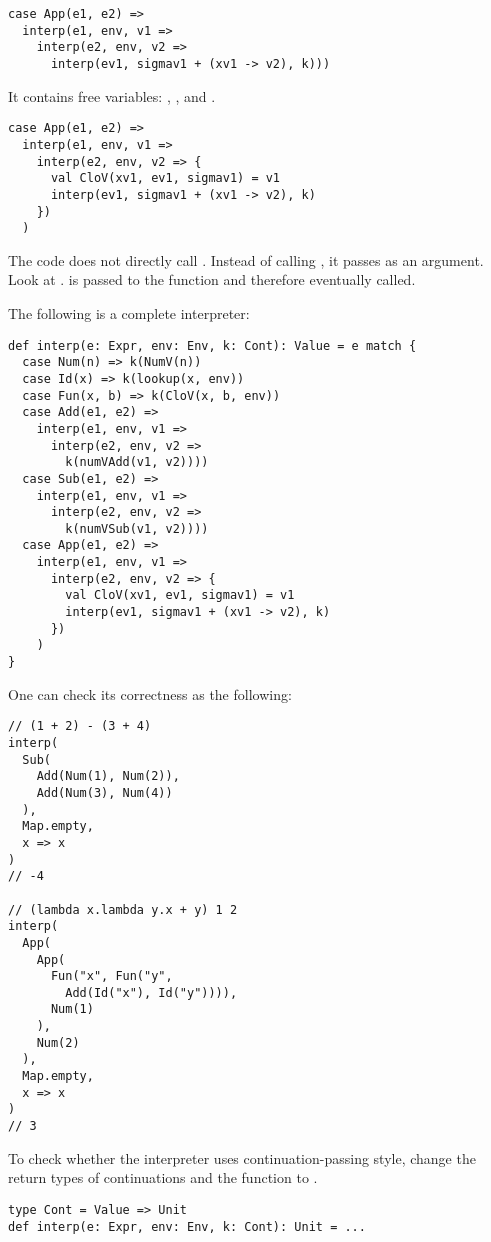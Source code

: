 \begin{verbatim}
case App(e1, e2) =>
  interp(e1, env, v1 =>
    interp(e2, env, v2 =>
      interp(ev1, sigmav1 + (xv1 -> v2), k)))
\end{verbatim}

It contains free variables: , , and .

\begin{verbatim}
case App(e1, e2) =>
  interp(e1, env, v1 =>
    interp(e2, env, v2 => {
      val CloV(xv1, ev1, sigmav1) = v1
      interp(ev1, sigmav1 + (xv1 -> v2), k)
    })
  )
\end{verbatim}

The code does not directly call . Instead of calling , it passes
 as an argument. Look at .
 is passed to the  function and therefore eventually called.

The following is a complete interpreter:

\begin{verbatim}
def interp(e: Expr, env: Env, k: Cont): Value = e match {
  case Num(n) => k(NumV(n))
  case Id(x) => k(lookup(x, env))
  case Fun(x, b) => k(CloV(x, b, env))
  case Add(e1, e2) =>
    interp(e1, env, v1 =>
      interp(e2, env, v2 =>
        k(numVAdd(v1, v2))))
  case Sub(e1, e2) =>
    interp(e1, env, v1 =>
      interp(e2, env, v2 =>
        k(numVSub(v1, v2))))
  case App(e1, e2) =>
    interp(e1, env, v1 =>
      interp(e2, env, v2 => {
        val CloV(xv1, ev1, sigmav1) = v1
        interp(ev1, sigmav1 + (xv1 -> v2), k)
      })
    )
}
\end{verbatim}

One can check its correctness as the following:

\begin{verbatim}
// (1 + 2) - (3 + 4)
interp(
  Sub(
    Add(Num(1), Num(2)),
    Add(Num(3), Num(4))
  ),
  Map.empty,
  x => x
)
// -4

// (lambda x.lambda y.x + y) 1 2
interp(
  App(
    App(
      Fun("x", Fun("y",
        Add(Id("x"), Id("y")))),
      Num(1)
    ),
    Num(2)
  ),
  Map.empty,
  x => x
)
// 3
\end{verbatim}

To check whether the interpreter uses continuation-passing style, change the
return types of continuations and the  function to .

\begin{verbatim}
type Cont = Value => Unit
def interp(e: Expr, env: Env, k: Cont): Unit = ...
\end{verbatim}

